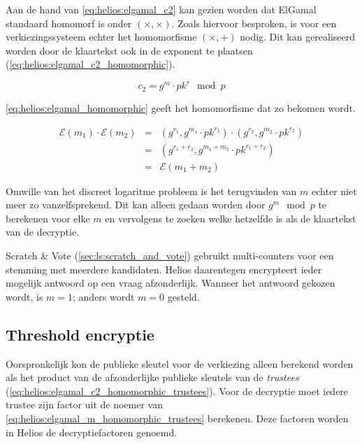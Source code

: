 \npar Aan de hand van \ref{eq:helios:elgamal_c2} kan gezien worden dat ElGamal standaard homomorf is onder $(\times, \times)$. Zoals hiervoor besproken, is voor een verkiezingssysteem echter het homomorfisme $(\times, +)$ nodig. Dit kan gerealiseerd worden door de klaartekst ook in de exponent te plaatsen (\ref{eq:helios:elgamal_c2_homomorphic}).

\begin{equation}
  \label{eq:helios:elgamal_c2_homomorphic}
  c_2 = g^m \cdot {pk}^r \mod{p}
\end{equation}

\ref{eq:helios:elgamal_homomorphic} geeft het homomorfisme dat zo bekomen wordt.

\begin{equation}
  \label{eq:helios:elgamal_homomorphic}
  \begin{array}{lcl}
    \mathcal{E}(m_1) \cdot \mathcal{E}(m_2) &=& (g^{r_1}, g^{m_1} \cdot {pk}^{r_1}) \cdot (g^{r_2}, g^{m_2} \cdot {pk}^{r_2}) \\
      &=& (g^{r_1 + r_2}, g^{m_1 + m_2} \cdot {pk}^{r_1 + r_2}) \\
      &=& \mathcal{E}(m_1 + m_2)
  \end{array}
\end{equation}

\npar Omwille van het discreet logaritme probleem is het terugvinden van $m$ echter niet meer zo vanzelfsprekend.\cite{menezes_vanstone_oorschot_handbook_of_applied_cryptography} Dit kan alleen gedaan worden door $g^m \mod{p}$ te berekenen voor elke $m$ en vervolgens te zoeken welke hetzelfde is als de klaartekst van de decryptie.

\npar Scratch \& Vote (\ref{sec:ls:scratch_and_vote}) gebruikt multi-counters voor een stemming met meerdere kandidaten. Helios daarentegen encrypteert ieder mogelijk antwoord op een vraag afzonderlijk. Wanneer het antwoord gekozen wordt, is $m = 1$; anders wordt $m = 0$ gesteld.

\subsection{Threshold encryptie}
\label{sec:helios:threshold_encryptie}

Oorspronkelijk kon de publieke sleutel voor de verkiezing alleen berekend worden als het product van de afzonderlijke publieke sleutels van de \textit{trustees} (\ref{eq:helios:elgamal_c2_homomorphic_trustees}). Voor de decryptie moet iedere trustee zijn factor uit de noemer van \ref{eq:helios:elgamal_m_homomorphic_trustees} berekenen. Deze factoren worden in Helios de decryptiefactoren genoemd.

